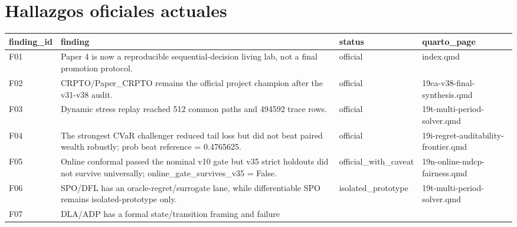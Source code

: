 \documentclass[
  spanish,
  11pt,
  letterpaper,
]{scrbook}
\newcounter{none} %
\theoremstyle{plain}
\theoremstyle{remark}
\begin{document}
\section{Hallazgos oficiales
actuales}\label{hallazgos-oficiales-actuales}

{\def\LTcaptype{none} %
\begin{longtable}[]{@{}
  >{\raggedright\arraybackslash}p{}
  >{\raggedright\arraybackslash}p{}
  >{\raggedright\arraybackslash}p{}
  >{\raggedright\arraybackslash}p{}@{}}
\toprule\noalign{}
\begin{minipage}[b]{\linewidth}\raggedright
finding\_id
\end{minipage} & \begin{minipage}[b]{\linewidth}\raggedright
finding
\end{minipage} & \begin{minipage}[b]{\linewidth}\raggedright
status
\end{minipage} & \begin{minipage}[b]{\linewidth}\raggedright
quarto\_page
\end{minipage} \\
\midrule\noalign{}
\endhead
\bottomrule\noalign{}
\endlastfoot
F01 & Paper 4 is now a reproducible sequential-decision living lab, not
a final promotion protocol. & official & index.qmd \\
F02 & CRPTO/Paper\_CRPTO remains the official project champion after the
v31-v38 audit. & official & 19ca-v38-final-synthesis.qmd \\
F03 & Dynamic stress replay reached 512 common paths and 494592 trace
rows. & official & 19t-multi-period-solver.qmd \\
F04 & The strongest CVaR challenger reduced tail loss but did not beat
paired wealth robustly; prob beat reference = 0.4765625. & official &
19i-regret-auditability-frontier.qmd \\
F05 & Online conformal passed the nominal v10 gate but v35 strict
holdouts did not survive universally; online\_gate\_survives\_v35 =
False. & official\_with\_caveat & 19n-online-mdcp-fairness.qmd \\
F06 & SPO/DFL has an oracle-regret/surrogate lane, while differentiable
SPO remains isolated-prototype only. & isolated\_prototype &
19t-multi-period-solver.qmd \\
F07 & DLA/ADP has a formal state/transition framing and failure

\end{longtable}}
\end{document}
